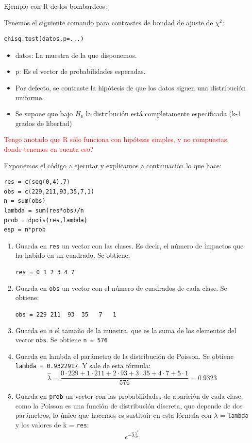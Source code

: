 \documentclass[palatino,nochap]{apuntes}
\begin{document}
\begin{example}
Ejemplo con R de los bombardeos:

Tenemos el siguiente comando para contrastes de bondad de ajuste de $\chi^2$:
\begin{verbatim}
chisq.test(datos,p=...)
\end{verbatim}

\begin{itemize}
\item datos: La muestra de la que disponemos.
\item p: Es el vector de probabilidades esperadas.
\item Por defecto, se contraste la hipótesis de que los datos siguen una distribución uniforme.
\item Se supone que bajo $H_0$ la distribución está completamente especificada (k-1 grados de libertad)
\end{itemize}
\textcolor{red}{Tengo anotado que R sólo funciona con hipótesis simples, y no compuestas, donde tenemos en cuenta eso?}

Exponemos el código a ejecutar y explicamos a continuación lo que hace:

\begin{verbatim}
res = c(seq(0,4),7)
obs = c(229,211,93,35,7,1)
n = sum(obs)
lambda = sum(res*obs)/n
prob = dpois(res,lambda)
esp = n*prob
\end{verbatim}

\begin{enumerate}
\item Guarda en \verb|res| un vector con las clases. Es decir, el número de impactos que ha habido en un cuadrado. Se obtiene:

\verb|res = 0 1 2 3 4 7|

\item Guarda en \verb|obs| un vector con el número de cuadrados de cada clase. Se obtiene:

\verb|obs = 229 211  93  35   7   1|

\item Guarda en \verb|n| el tamaño de la muestra, que es la suma de los elementos del vector \verb|obs|. Se obtiene \verb|n = 576|
\item Guarda en lambda el parámetro de la distribución de Poisson. Se obtiene \verb|lambda = 0.9322917|. Y sale de esta fórmula:
$$ \hat{\lambda} = \frac{0\cdot229 + 1\cdot211+2\cdot93+3\cdot35+4\cdot7+5\cdot1}{576}=0.9323$$
\item Guarda en \verb|prob| un vector con las probabilidades de aparición de cada clase, como la Poisson es una función de distribución discreta, que depende de dos parámetros, lo único que hacemos es sustituir en esta fórmula con $\lambda$ = \verb|lambda| y los valores de k = \verb|res|:
$$e^{-\hat{\lambda}\frac{\hat{\lambda}^k}{k!}}$$


\end{enumerate}
\end{example}
\end{document}
